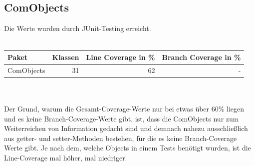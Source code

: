 \documentclass[a4paper]{article}
\begin{document}
\subsection{ComObjects}
Die Werte wurden durch JUnit-Testing erreicht.
 \ \\ \ \\ 	
	\noindent
	\begin{tabular}{|l|r|r|r|} \hline
	Paket & Klassen & Line Coverage in \% & Branch Coverage in \% \\ \hline \hline
	ComObjects & 31 & 62 & -\\ \hline
\end{tabular}
 \ \\ \ \\ 
Der Grund, warum die Gesamt-Coverage-Werte nur bei etwas über 60\% liegen und es keine Branch-Coverage-Werte gibt, ist, dass die ComObjects nur zum Weiterreichen von Information gedacht sind und demnach nahezu ausschließlich aus getter- und setter-Methoden bestehen, für die es keine Branch-Coverage Werte gibt. Je nach dem, welche Objects in einem Tests benötigt wurden, ist die Line-Coverage mal höher, mal niedriger. \\
\ \\
\end{document}

